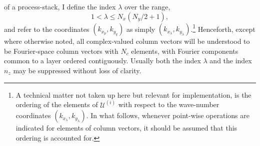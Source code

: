 \documentclass[12pt, letterpaper, oneside, leqno, openright]{memoir}
\newcommand{\ufield}{\mathscr{U}}
\begin{document}
of a process-stack, I define the index $\lambda$ over the range,
%
\begin{equation}
1 <\lambda  \le N_x\left(N_y/2+1\right),
\end{equation}
and refer to the coordinates $(k_{x_p},k_{y_q})$ as simply
$(k_{x_\lambda}, k_{y_\lambda})$.\footnote{A technical matter
not taken up here but relevant for implementation, is the
ordering of the elements of $\ufield^{(i)}$ with respect to the
wave-number coordinates $(k_{x_\lambda},k_{y_\lambda})$.
In what follows, whenever point-wise operations are indicated
for elements of column vectors, it should be assumed that this
ordering is accounted for.}
%
Henceforth, except where otherwise noted, all complex-valued
column vectors will be understood to be Fourier-space column
vectors with $N_c$ elements, with Fourier components common to
a layer ordered contiguously. Usually both the index $\lambda$
and the index $n_z$ may be suppressed without loss of clarity.
%
\par
%
\end{document}
